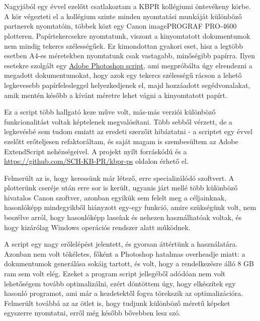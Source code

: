 \chapter{\bevezetes}

Nagyjából egy évvel ezelőtt csatlakoztam a KBPR kollégiumi öntevékeny körbe. A kör végezteti el a kollégium szinte minden nyomtatási munkáját különböző partnerek nyomtatóin, többek közt egy Canon imagePROGRAF PRO-4600 plotteren. Papírtekercsekre nyomtatunk, viszont a kinyomtatott dokumentumok nem mindig tekercs szélességűek. Ez kimondottan gyakori eset, hisz a legtöbb esetben A4-es méretekben nyomtatunk csak vastagabb, minőségibb papírra. Ilyen esetekre szolgált egy \href{fig:old_ui}{Adobe Photoshop script}, ami megpróbálta úgy elrendezni a megadott dokumentumokat, hogy azok egy tekercs szélességű rácson a lehető legkevesebb papírfelesleggel helyezkedjenek el, majd hozzáadott segédvonalakat, amik mentén később a kívánt méretre lehet vágni a kinyomtatott papírt.

Ez a script több hallgató keze műve volt, más-más verziói különböző funkcionalitást voltak képtelenek megvalósítani. Több sebből vérzett, de a legkevésbé sem tudom emiatt az eredeti szerzőit hibáztatni - a scriptet egy évvel ezelőtt erőteljesen refaktoráltam, és saját magam is szembesültem az Adobe ExtendScript nehézségeivel. A projekt nyílt forráskódú és a \href{https://github.com/SCH-KB-PR/kbpr-ps}{https://github.com/SCH-KB-PR/kbpr-ps} oldalon érhető el.

Felmerült az is, hogy keressünk már létező, erre specializálódó szoftvert. A plotterünk cseréje után erre sor is került, ugyanis járt mellé több különböző hivatalos Canon szoftver, azonban egyikük sem felelt meg a céljainknak, hasonlóképp mindegyikből hiányzott egy-egy funkció, amire szükségünk volt, nem beszélve arról, hogy hasonlóképp lassúak és nehezen használhatóak voltak, és hogy kizárólag Windows operációs rendszer alatt működnek.

A script egy nagy erőlelépést jelentett, és gyorsan áttértünk a használatára. Azonban nem volt tökéletes, főként a Photoshop hatalmas overheadje miatt: a dokumentumok generálása sokáig tartott, és volt, hogy a rendelkezésre álló 8 GB ram sem volt elég. Ezeket a program script jellegéből adódóan nem volt lehetőségem tovább optimalizálni, ezért döntöttem úgy, hogy elkészítek egy hasonló programot, ami már a kezdetektől fogva törekszik az optimalizációra. Felmerült továbbá az az ötlet is, hogy tudjunk különböző méretű képeket egyszerre nyomtatni, erről még később bővebben lesz szó.

